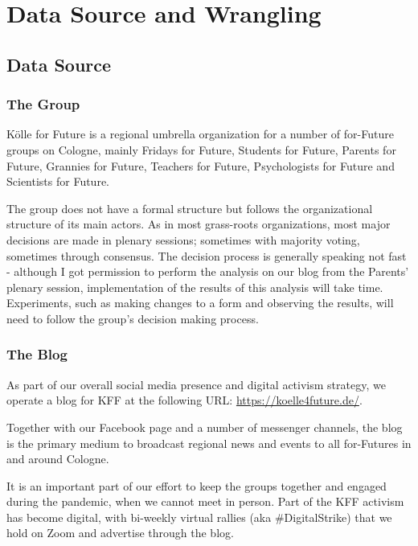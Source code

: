 %
%

\pagebreak
\section{Data Source and Wrangling}

\onehalfspacing

\subsection{Data Source}

\subsubsection{The Group}

Kölle for Future is a regional umbrella organization for a number of for-Future groups on Cologne, mainly Fridays for Future, Students for Future, Parents for Future, Grannies for Future, Teachers for Future, Psychologists for Future and Scientists for Future.

The group does not have a formal structure but follows the organizational structure of its main actors. As in most grass-roots organizations, most major decisions are made in plenary sessions; sometimes with majority voting, sometimes through consensus. The decision process is generally speaking not fast - although I got permission to perform the analysis on our blog from the Parents' plenary session, implementation of the results of this analysis will take time. Experiments, such as making changes to a form and observing the results, will need to follow the group's decision making process.

\subsubsection{The Blog}

As part of our overall social media presence and digital activism strategy, we operate a blog for KFF at the following URL: \url{https://koelle4future.de/}.

Together with our Facebook page and a number of messenger channels, the blog is the primary medium to broadcast regional news and events to all for-Futures in and around Cologne.

It is an important part of our effort to keep the groups together and engaged during the pandemic, when we cannot meet in person. Part of the KFF activism has become digital, with bi-weekly virtual rallies (aka \#DigitalStrike) that we hold on Zoom and advertise through the blog. 

